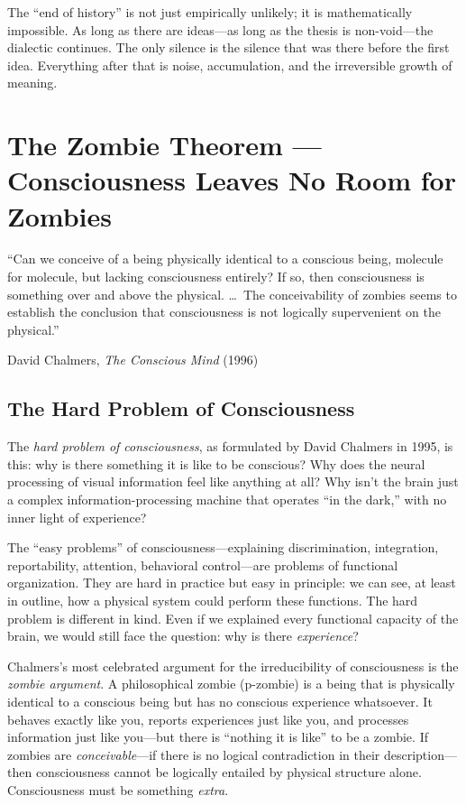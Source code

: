 The ``end of history'' is not just empirically unlikely; it is
mathematically impossible.  As long as there are ideas---as long as
the thesis is non-void---the dialectic continues.  The only silence
is the silence that was there before the first idea.  Everything after
that is noise, accumulation, and the irreversible growth of meaning.



\chapter{The Zombie Theorem --- Consciousness Leaves No Room for Zombies}
\label{ch:zombie-theorem}

\epigraph{``Can we conceive of a being physically identical to a conscious
being, molecule for molecule, but lacking consciousness entirely?  If so,
then consciousness is something over and above the physical.
\ldots\ The conceivability of zombies seems to establish the conclusion that
consciousness is not logically supervenient on the physical.''}{David Chalmers, \textit{The Conscious Mind} (1996)}

\section{The Hard Problem of Consciousness}

The \emph{hard problem of consciousness}, as formulated by David Chalmers
in 1995, is this: why is there something it is like to be conscious?
Why does the neural processing of visual information feel like anything
at all?  Why isn't the brain just a complex information-processing
machine that operates ``in the dark,'' with no inner light of experience?

The ``easy problems'' of consciousness---explaining discrimination,
integration, reportability, attention, behavioral control---are
problems of functional organization.  They are hard in practice but
easy in principle: we can see, at least in outline, how a physical
system could perform these functions.  The hard problem is different
in kind.  Even if we explained every functional capacity of the brain,
we would still face the question: why is there \emph{experience}?

Chalmers's most celebrated argument for the irreducibility of
consciousness is the \emph{zombie argument}.  A philosophical zombie
(p-zombie) is a being that is physically identical to a conscious being
but has no conscious experience whatsoever.  It behaves exactly like you,
reports experiences just like you, and processes information just like
you---but there is ``nothing it is like'' to be a zombie.  If zombies
are \emph{conceivable}---if there is no logical contradiction in their
description---then consciousness cannot be logically entailed by
physical structure alone.  Consciousness must be something \emph{extra}.

